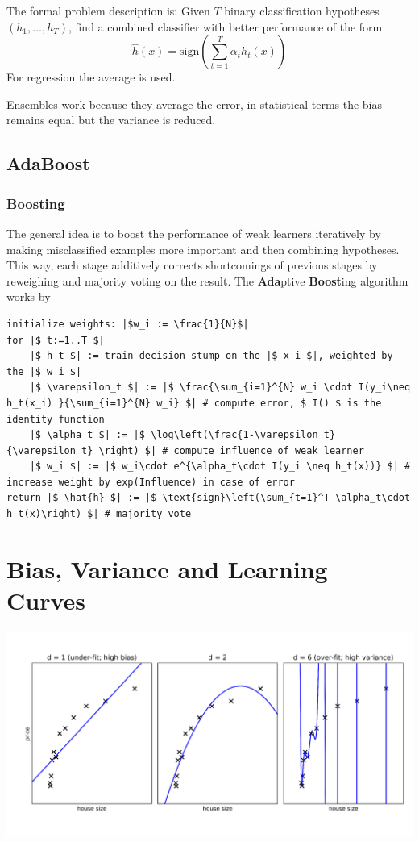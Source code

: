 \documentclass[11pt]{article}
\theoremstyle{definition}
\begin{document}
The formal problem description is: Given $T$ binary classification hypotheses $(h_1,\dots, h_T)$, find a combined classifier with better performance of the form
\begin{equation*}
	\hat{h}(x) = \text{sign}\left( \sum_{t=1}^{T} \alpha_t h_t (x) \right)
\end{equation*}
For regression the average is used.

Ensembles work because they average the error, in statistical terms the bias remains equal but the variance is reduced.

\subsection{AdaBoost}
\subsubsection{Boosting}
The general idea is to boost the performance of weak learners iteratively by making misclassified examples more important and then combining hypotheses. This way, each stage additively corrects shortcomings of previous stages by reweighing and majority voting on the result. The \textbf{Ada}ptive \textbf{Boost}ing algorithm works by
\begin{verbatim}
initialize weights: |$w_i := \frac{1}{N}$|
for |$ t:=1..T $|
	|$ h_t $| := train decision stump on the |$ x_i $|, weighted by the |$ w_i $|
	|$ \varepsilon_t $| := |$ \frac{\sum_{i=1}^{N} w_i \cdot I(y_i\neq h_t(x_i) }{\sum_{i=1}^{N} w_i} $| # compute error, $ I() $ is the identity function
	|$ \alpha_t $| := |$ \log\left(\frac{1-\varepsilon_t}{\varepsilon_t} \right) $| # compute influence of weak learner
	|$ w_i $| := |$ w_i\cdot e^{\alpha_t\cdot I(y_i \neq h_t(x))} $| # increase weight by exp(Influence) in case of error
return |$ \hat{h} $| := |$ \text{sign}\left(\sum_{t=1}^T \alpha_t\cdot h_t(x)\right) $| # majority vote
\end{verbatim}

\section{Bias, Variance and Learning Curves}

\begin{center}
	\includegraphics[width=0.8\linewidth]{img/bias_variance_tradeoff}
\end{center}
\end{document}
